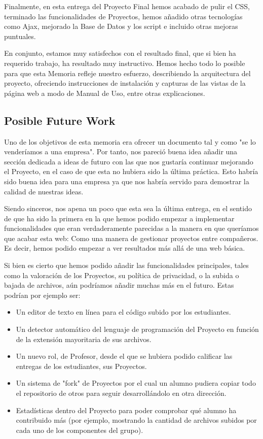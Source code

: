 \documentclass[12pt]{report}
\begin{document}
Finalmente, en esta entrega del Proyecto Final hemos acabado de pulir el CSS, terminado las funcionalidades de Proyectos, hemos añadido otras tecnologías como Ajax, mejorado la Base de Datos y los script e incluido otras mejoras puntuales.

En conjunto, estamos muy satisfechos con el resultado final, que si bien ha requerido trabajo, ha resultado muy instructivo. Hemos hecho todo lo posible para que esta Memoria refleje nuestro esfuerzo, describiendo la arquitectura del proyecto, ofreciendo instrucciones de instalación y capturas de las vistas de la página web a modo de Manual de Uso, entre otras explicaciones. 


\subsection{Posible Future Work}

Uno de los objetivos de esta memoria era ofrecer un documento tal y como "se lo venderíamos a una empresa". Por tanto, nos pareció buena idea añadir una sección dedicada a ideas de futuro con las que nos gustaría continuar mejorando el Proyecto, en el caso de que esta no hubiera sido la última práctica. Esto habría sido buena idea para una empresa ya que nos habría servido para demostrar la calidad de nuestras ideas.

Siendo sinceros, nos apena un poco que esta sea la última entrega, en el sentido de que ha sido la primera en la que hemos podido empezar a implementar funcionalidades que eran verdaderamente parecidas a la manera en que queríamos que acabar esta web: Como una manera de gestionar proyectos entre compañeros. Es decir, hemos podido empezar a ver resultados más allá de una web básica.

Si bien es cierto que hemos podido añadir las funcionalidades principales, tales como la valoración de los Proyectos, su política de privacidad, o la subida o bajada de archivos, aún podríamos añadir muchas más en el futuro. Estas podrían por ejemplo ser:

\begin{itemize}
    \item Un editor de texto en línea para el código subido por los estudiantes.
    \item Un detector automático del lenguaje de programación del Proyecto en función de la extensión mayoritaria de sus archivos.
    \item Un nuevo rol, de Profesor, desde el que se hubiera podido calificar las entregas de los estudiantes, sus Proyectos.
    \item Un sistema de "fork" de Proyectos por el cual un alumno pudiera copiar todo el repositorio de otros para seguir desarrollándolo en otra dirección.
    \item Estadísticas dentro del Proyecto para poder comprobar qué alumno ha contribuido más (por ejemplo, mostrando la cantidad de archivos subidos por cada uno de los componentes del grupo).
\end{itemize}
\end{document}
